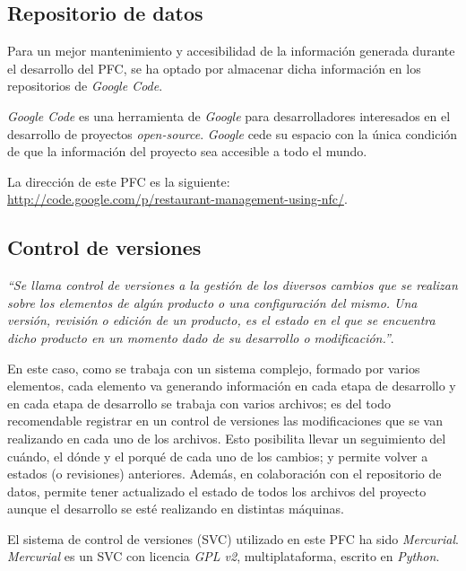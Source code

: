   \subsection{Repositorio de datos}
  Para un mejor mantenimiento y accesibilidad de la información generada
  durante el desarrollo del \acs{PFC}, se ha optado por almacenar dicha
  información en los repositorios de \emph{Google Code}.

  \emph{Google Code} es una herramienta de \emph{Google} para desarrolladores 
  interesados en el desarrollo de proyectos \emph{open-source}. \emph{Google}
  cede su espacio con la única condición de que la información del proyecto
  sea accesible a todo el mundo.

  La dirección de este \acs{PFC} es la siguiente:\\
  \url{http://code.google.com/p/restaurant-management-using-nfc/}.

  \subsection{Control de versiones}
  \emph{``Se llama control de versiones a la gestión de los diversos cambios 
  que se realizan sobre los elementos de algún producto o una configuración 
  del mismo. Una versión, revisión o edición de un producto, es el estado en 
  el que se encuentra dicho producto en un momento dado de su desarrollo o 
  modificación.''}\cite{bib:wiki}.
  
  En este caso, como se trabaja con un sistema complejo, formado por varios 
  elementos, cada elemento va generando información en cada etapa de 
  desarrollo y en cada etapa de desarrollo se trabaja con varios archivos; es 
  del todo recomendable registrar en un control de versiones las modificaciones
  que se van realizando en cada uno de los archivos. Esto posibilita llevar
  un seguimiento del cuándo, el dónde y el porqué de cada uno de los cambios;
  y permite volver a estados (o revisiones) anteriores. Además, en colaboración
  con el repositorio de datos, permite tener actualizado el estado de 
  todos los archivos del proyecto aunque el desarrollo se esté realizando en 
  distintas máquinas.

  El sistema de control de versiones (\acs{SVC}) utilizado en este \acs{PFC}
  ha sido \emph{Mercurial}. \emph{Mercurial} es un \acs{SVC} con 
  licencia \emph{\acs{GPL} v2}, multiplataforma, escrito en \emph{Python}.

